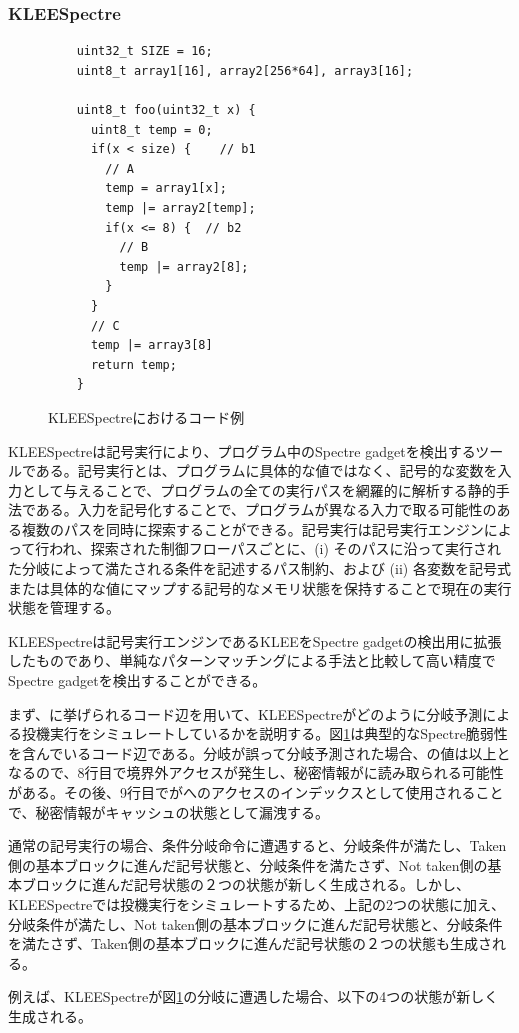 \subsubsection{KLEESpectre}

\begin{figure}
  \begin{verbatim}
    uint32_t SIZE = 16;
    uint8_t array1[16], array2[256*64], array3[16];

    uint8_t foo(uint32_t x) {
      uint8_t temp = 0;
      if(x < size) {    // b1
        // A
        temp = array1[x]; 
        temp |= array2[temp];
        if(x <= 8) {  // b2
          // B 
          temp |= array2[8];
        }
      }
      // C
      temp |= array3[8]
      return temp;
    }
\end{verbatim}
  \caption{KLEESpectreにおけるコード例}
  \label{klee_code}
\end{figure}

KLEESpectre\cite{wang2020kleespectre}は記号実行により、プログラム中のSpectre gadgetを検出するツールである。記号実行とは、プログラムに具体的な値ではなく、記号的な変数を入力として与えることで、プログラムの全ての実行パスを網羅的に解析する静的手法である。入力を記号化することで、プログラムが異なる入力で取る可能性のある複数のパスを同時に探索することができる。記号実行は記号実行エンジンによって行われ、探索された制御フローパスごとに、(i) そのパスに沿って実行された分岐によって満たされる条件を記述するパス制約、および (ii) 各変数を記号式または具体的な値にマップする記号的なメモリ状態を保持することで現在の実行状態を管理する\cite{baldoni2018survey}。\par

KLEESpectreは記号実行エンジンであるKLEE\cite{cadar2008klee}をSpectre gadgetの検出用に拡張したものであり、単純なパターンマッチングによる手法\cite{Spectre-Scanner}と比較して高い精度でSpectre gadgetを検出することができる。\par
まず、\cite{wang2020kleespectre}に挙げられるコード辺を用いて、KLEESpectreがどのように分岐予測による投機実行をシミュレートしているかを説明する。図\ref{klee_code}は典型的なSpectre脆弱性を含んでいるコード辺である。分岐が誤って分岐予測された場合、の値は以上となるので、8行目で境界外アクセスが発生し、秘密情報がに読み取られる可能性がある。その後、9行目でがへのアクセスのインデックスとして使用されることで、秘密情報がキャッシュの状態として漏洩する。\par
通常の記号実行の場合、条件分岐命令に遭遇すると、分岐条件が満たし、Taken側の基本ブロックに進んだ記号状態と、分岐条件を満たさず、Not taken側の基本ブロックに進んだ記号状態の２つの状態が新しく生成される。しかし、KLEESpectreでは投機実行をシミュレートするため、上記の2つの状態に加え、分岐条件が満たし、Not taken側の基本ブロックに進んだ記号状態と、分岐条件を満たさず、Taken側の基本ブロックに進んだ記号状態の２つの状態も生成される。\par
例えば、KLEESpectreが図\ref{klee_code}の分岐に遭遇した場合、以下の4つの状態が新しく生成される。\par

